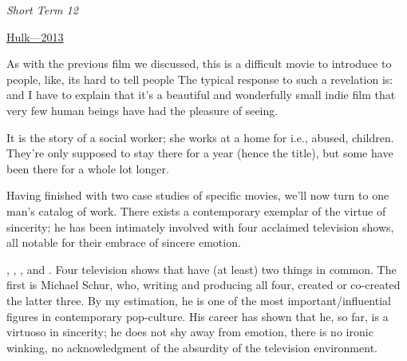 \documentclass[../butidigress.tex]{subfiles}
\begin{document}

\begin{somenotes}{\textit{Short Term 12}}
    \item \href{https://birthmoviesdeath.com/2013/03/16/sxsw-review-why-short-term-12-is-a-masterpiece}{Hulk---2013}\autocite{hulkshortterm2015}
\end{somenotes}

As with the previous film we discussed, this is a difficult movie to introduce to people, like, its hard to tell people 
The typical response to such a revelation is:  and I have to explain that it's a beautiful and wonderfully small indie film that very few human beings have had the pleasure of seeing.

It is the story of a social worker; she works at a home for  i.e., abused, children.
They're only supposed to stay there for a year (hence the title), but some have been there for a whole lot longer.

\entryskip

Having finished with two case studies of specific movies, we'll now turn to one man's catalog of work.
There exists a contemporary exemplar of the virtue of sincerity; he has been intimately involved with four acclaimed television shows, all notable for their embrace of sincere emotion.

, , , and .
Four television shows that have (at least) two things in common.
The first is Michael Schur, who, writing and producing all four, created or co-created the latter three.
By my estimation, he is one of the most important/influential figures in contemporary pop-culture.
His career has shown that he, so far, is a virtuoso in sincerity; he does not shy away from emotion, there is no ironic winking, no acknowledgment of the absurdity of the television environment.
\end{document}
